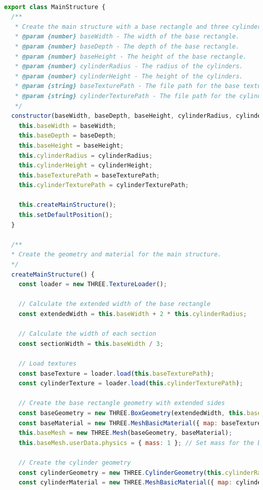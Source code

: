 \documentclass{article}
\begin{document}
\begin{lstlisting}[language=JavaScript, caption={JS Class for MainStructure}]

export class MainStructure {
  /**
   * Create the main structure with a base rectangle and three cylinders on top.
   * @param {number} baseWidth - The width of the base rectangle.
   * @param {number} baseDepth - The depth of the base rectangle.
   * @param {number} baseHeight - The height of the base rectangle.
   * @param {number} cylinderRadius - The radius of the cylinders.
   * @param {number} cylinderHeight - The height of the cylinders.
   * @param {string} baseTexturePath - The file path for the base texture image.
   * @param {string} cylinderTexturePath - The file path for the cylinder texture image.
   */
  constructor(baseWidth, baseDepth, baseHeight, cylinderRadius, cylinderHeight, baseTexturePath, cylinderTexturePath) {
    this.baseWidth = baseWidth;
    this.baseDepth = baseDepth;
    this.baseHeight = baseHeight;
    this.cylinderRadius = cylinderRadius;
    this.cylinderHeight = cylinderHeight;
    this.baseTexturePath = baseTexturePath;
    this.cylinderTexturePath = cylinderTexturePath;

    this.createMainStructure();
    this.setDefaultPosition();
  }

  /**
  * Create the geometry and material for the main structure.
  */
  createMainStructure() {
    const loader = new THREE.TextureLoader();

    // Calculate the extended width of the base rectangle
    const extendedWidth = this.baseWidth + 2 * this.cylinderRadius;

    // Calculate the width of each section
    const sectionWidth = this.baseWidth / 3;

    // Load textures
    const baseTexture = loader.load(this.baseTexturePath);
    const cylinderTexture = loader.load(this.cylinderTexturePath);

    // Create the base rectangle geometry with extended sides
    const baseGeometry = new THREE.BoxGeometry(extendedWidth, this.baseHeight, this.baseDepth);
    const baseMaterial = new THREE.MeshBasicMaterial({ map: baseTexture });
    this.baseMesh = new THREE.Mesh(baseGeometry, baseMaterial);
    this.baseMesh.userData.physics = { mass: 1 }; // Set mass for the base

    // Create the cylinder geometry
    const cylinderGeometry = new THREE.CylinderGeometry(this.cylinderRadius, this.cylinderRadius, this.cylinderHeight, 32);
    const cylinderMaterial = new THREE.MeshBasicMaterial({ map: cylinderTexture });


\end{lstlisting}
\end{document}
